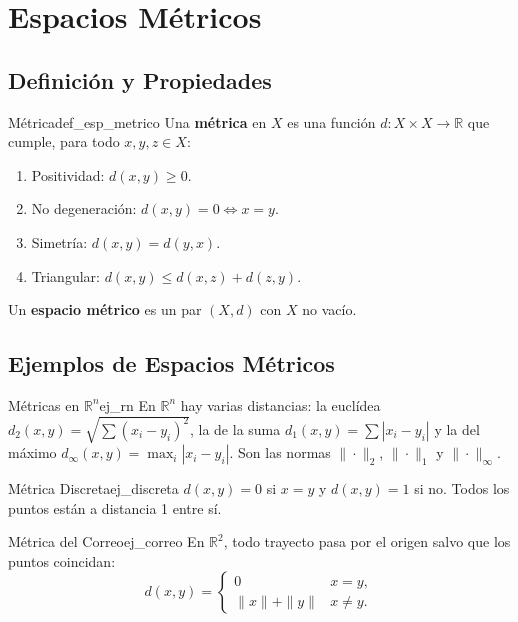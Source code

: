 \documentclass[11pt, a4paper]{article}
\begin{document}
\newpage

\section{Espacios Métricos}

\subsection{Definición y Propiedades}

\begin{definicion}{Métrica}{def_esp_metrico}
Una \textbf{métrica} en $X$ es una función $d: X \times X \to \mathbb{R}$ que cumple, para todo
$x, y, z \in X$:
\begin{enumerate}
    \item Positividad: $d(x, y) \ge 0$.
    \item No degeneración: $d(x, y) = 0 \iff x = y$.
    \item Simetría: $d(x, y) = d(y, x)$.
    \item Triangular: $d(x, y) \le d(x, z) + d(z, y)$.
\end{enumerate}
Un \textbf{espacio métrico} es un par $(X, d)$ con $X$ no vacío.
\end{definicion}

\subsection{Ejemplos de Espacios Métricos}

\begin{ejemplo}{Métricas en $\mathbb{R}^n$}{ej_rn}
En $\mathbb{R}^n$ hay varias distancias: la euclídea $d_2(x,y) = \sqrt{\sum (x_i-y_i)^2}$, la
de la suma $d_1(x,y) = \sum |x_i - y_i|$ y la del máximo $d_\infty(x,y) = \max_i |x_i - y_i|$. Son
las normas $\|\cdot\|_2$, $\|\cdot\|_1$ y $\|\cdot\|_\infty$.
\end{ejemplo}

\begin{ejemplo}{Métrica Discreta}{ej_discreta}
$d(x,y) = 0$ si $x = y$ y $d(x,y) = 1$ si no. Todos los puntos están a distancia 1 entre sí.
\end{ejemplo}

\begin{ejemplo}{Métrica del Correo}{ej_correo}
En $\mathbb{R}^2$, todo trayecto pasa por el origen salvo que los puntos coincidan:
$$ d(x,y) = \begin{cases} 0 & x = y, \\ \|x\| + \|y\| & x \ne y. \end{cases} $$
\end{ejemplo}
\end{document}
